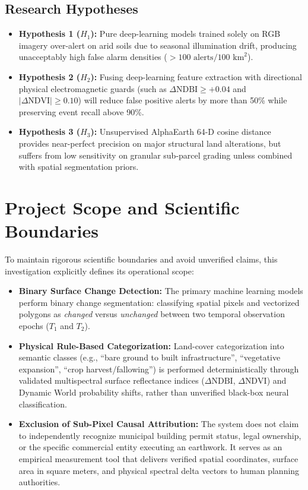 \subsection{Research Hypotheses}
\begin{itemize}
    \item \textbf{Hypothesis 1 ($H_1$):} Pure deep-learning models trained solely on RGB imagery over-alert on arid soils due to seasonal illumination drift, producing unacceptably high false alarm densities ($>100\text{ alerts}/100\text{ km}^2$).
    \item \textbf{Hypothesis 2 ($H_2$):} Fusing deep-learning feature extraction with directional physical electromagnetic guards (such as $\Delta\text{NDBI} \ge +0.04$ and $|\Delta\text{NDVI}| \ge 0.10$) will reduce false positive alerts by more than 50\% while preserving event recall above 90\%.
    \item \textbf{Hypothesis 3 ($H_3$):} Unsupervised AlphaEarth 64-D cosine distance provides near-perfect precision on major structural land alterations, but suffers from low sensitivity on granular sub-parcel grading unless combined with spatial segmentation priors.
\end{itemize}

\section{Project Scope and Scientific Boundaries}
\label{sec:intro_scope}
To maintain rigorous scientific boundaries and avoid unverified claims, this investigation explicitly defines its operational scope:
\begin{itemize}
    \item \textbf{Binary Surface Change Detection:} The primary machine learning models perform binary change segmentation: classifying spatial pixels and vectorized polygons as \textit{changed} versus \textit{unchanged} between two temporal observation epochs ($T_1$ and $T_2$).
    \item \textbf{Physical Rule-Based Categorization:} Land-cover categorization into semantic classes (e.g., ``bare ground to built infrastructure'', ``vegetative expansion'', ``crop harvest/fallowing'') is performed deterministically through validated multispectral surface reflectance indices ($\Delta\text{NDBI}$, $\Delta\text{NDVI}$) and Dynamic World probability shifts, rather than unverified black-box neural classification.
    \item \textbf{Exclusion of Sub-Pixel Causal Attribution:} The system does not claim to independently recognize municipal building permit status, legal ownership, or the specific commercial entity executing an earthwork. It serves as an empirical measurement tool that delivers verified spatial coordinates, surface area in square meters, and physical spectral delta vectors to human planning authorities.
\end{itemize}

